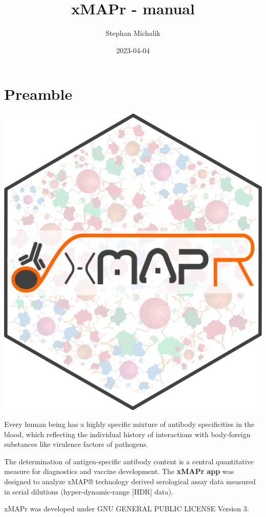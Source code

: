 \documentclass[
]{book}
\title{xMAPr - manual}
\author{Stephan Michalik}
\date{2023-04-04}
\begin{document}
\maketitle

{
\setcounter{tocdepth}{1}
\tableofcontents
}
\hypertarget{preamble}{%
\chapter{Preamble}\label{preamble}}

\includegraphics[width=7.07in]{figures/xMAPr_logo_mod_hexbin}

Every human being has a highly specific mixture of antibody specificities in the blood, which reflecting the individual history of interactions with body-foreign substances like virulence factors of pathogens.

The determination of antigen-specific antibody content is a central quantitative measure for diagnostics and vaccine development. The \textbf{xMAPr app} was designed to analyze xMAP® technology derived serological assay data measured in serial dilutions (hyper-dynamic-range {[}HDR{]} data).

xMAPr was developed under GNU GENERAL PUBLIC LICENSE Version 3.
\end{document}
